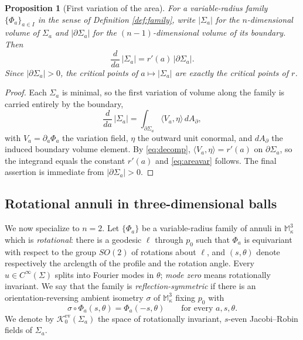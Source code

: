 \documentclass[10pt,a4paper]{amsart}
\newtheorem{proposition}[theorem]{Proposition}
\newcommand{\M}{\mathbb{M}}
\newcommand{\Ker}{\mathcal{K}}
\begin{document}
\begin{proposition}[First variation of the area]\label{prop:area}
For a variable-radius family $\{\Phi_a\}_{a\in I}$ in the sense of Definition \ref{def:family}, write $|\Sigma_a|$ for the $n$-dimensional volume of $\Sigma_a$ and $|\partial\Sigma_a|$ for the $(n-1)$-dimensional volume of its boundary. Then
\begin{equation}\label{eq:areavar}
\frac{d}{da}\,|\Sigma_a|=r'(a)\,|\partial\Sigma_a|.
\end{equation}
Since $|\partial\Sigma_a|>0$, the critical points of $a\mapsto|\Sigma_a|$ are exactly the critical points of $r$.
\end{proposition}

\begin{proof}
Each $\Sigma_a$ is minimal, so the first variation of volume along the family is carried entirely by the boundary,
\[
\frac{d}{da}\,|\Sigma_a|=\int_{\partial\Sigma_a}\langle V_a,\eta\rangle\,dA_\partial,
\]
with $V_a=\partial_a\Phi_a$ the variation field, $\eta$ the outward unit conormal, and $dA_\partial$ the induced boundary volume element. By \eqref{eq:decomp}, $\langle V_a,\eta\rangle=r'(a)$ on $\partial\Sigma_a$, so the integrand equals the constant $r'(a)$ and \eqref{eq:areavar} follows. The final assertion is immediate from $|\partial\Sigma_a|>0$.
\end{proof}

\subsection*{Rotational annuli in three-dimensional balls}

We now specialize to $n=2$. Let $\{\Phi_a\}$ be a variable-radius family of annuli in $\M^3_\kappa$ which is \emph{rotational}: there is a geodesic $\ell$ through $p_0$ such that $\Phi_a$ is equivariant with respect to the group $SO(2)$ of rotations about $\ell$, and $(s,\theta)$ denote respectively the arclength of the profile and the rotation angle. Every $u\in C^\infty(\Sigma)$ splits into Fourier modes in $\theta$; \emph{mode zero} means rotationally invariant. We say that the family is \emph{reflection-symmetric} if there is an orientation-reversing ambient isometry $\sigma$ of $\M^3_\kappa$ fixing $p_0$ with
\begin{equation}\label{eq:reflection}
\sigma\circ\Phi_a(s,\theta)=\Phi_a(-s,\theta)\qquad\text{for every }a,s,\theta.
\end{equation}
We denote by $\Ker_0^{\mathrm{ev}}(\Sigma_a)$ the space of rotationally invariant, $s$-even Jacobi--Robin fields of $\Sigma_a$.
\end{document}
